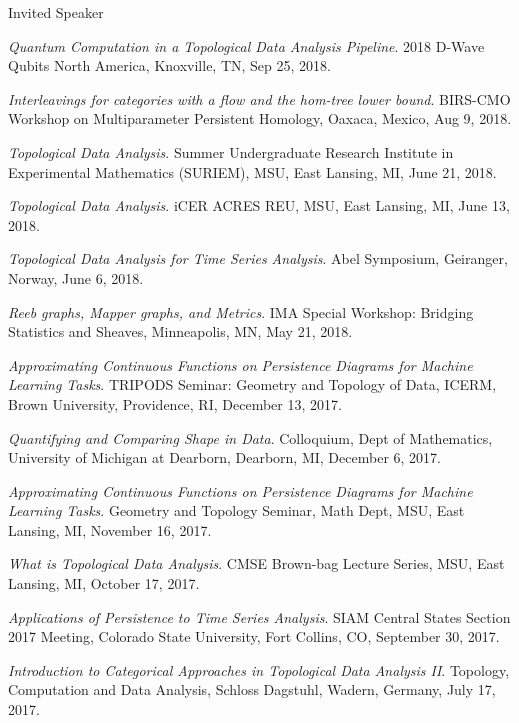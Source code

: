 \documentclass{resume} %
\begin{document}
\begin{rSection}{Invited Speaker}
\begin{etaremune}
\item\emph{Quantum Computation in a Topological Data Analysis Pipeline}. 2018 D-Wave Qubits North America, Knoxville, TN, Sep 25, 2018. 

\item\emph{Interleavings for categories with a flow and the hom-tree lower bound}. BIRS-CMO Workshop on Multiparameter Persistent Homology, Oaxaca, Mexico, Aug 9, 2018. 

\item\emph{Topological Data Analysis}. Summer Undergraduate Research Institute in Experimental Mathematics (SURIEM), MSU, East Lansing, MI, June 21, 2018. 

\item\emph{Topological Data Analysis}. iCER ACRES REU, MSU, East Lansing, MI, June 13, 2018. 

\item\emph{Topological Data Analysis for Time Series Analysis}. Abel Symposium, Geiranger, Norway, June 6, 2018. 

\item\emph{Reeb graphs, Mapper graphs, and Metrics}. IMA Special Workshop: Bridging Statistics and Sheaves, Minneapolis, MN, May 21, 2018. 

\item\emph{Approximating Continuous Functions on Persistence Diagrams for Machine Learning Tasks}. TRIPODS Seminar: Geometry and Topology of Data, ICERM, Brown University, Providence, RI, December 13, 2017. 

\item\emph{Quantifying and Comparing Shape in Data}. Colloquium, Dept of Mathematics, University of Michigan at Dearborn, Dearborn, MI, December 6, 2017. 

\item\emph{Approximating Continuous Functions on Persistence Diagrams for Machine Learning Tasks}. Geometry and Topology Seminar, Math Dept, MSU, East Lansing, MI, November 16, 2017. 

\item\emph{What is Topological Data Analysis}. CMSE Brown-bag Lecture Series, MSU, East Lansing, MI, October 17, 2017. 

\item\emph{Applications of Persistence to Time Series Analysis}. SIAM Central States Section 2017 Meeting, Colorado State University, Fort Collins, CO, September 30, 2017. 

\item\emph{Introduction to Categorical Approaches in Topological Data Analysis II}. Topology, Computation and Data Analysis, Schloss Dagstuhl, Wadern, Germany, July 17, 2017. 


\end{etaremune}
\end{rSection}
\end{document}

